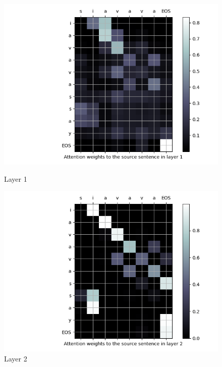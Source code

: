 \begin{enumarabic}
    \begin{figure}[H]
      \centering
      \begin{minipage}[b]{0.33\textwidth}
        \centering
        \includegraphics[width=\textwidth]{figures/siavava-0.png}
        \caption{Layer 1}
        \label{fig:siavava-0}
      \end{minipage}
      \hfill
      \begin{minipage}[b]{0.33\textwidth}
        \centering
        \includegraphics[width=\textwidth]{figures/siavava-1.png}
        \caption{Layer 2}
        \label{fig:siavava-1}
      \end{minipage}
      \begin{minipage}[b]{0.33\textwidth}

\end{minipage}
\end{figure}
\end{enumarabic}
